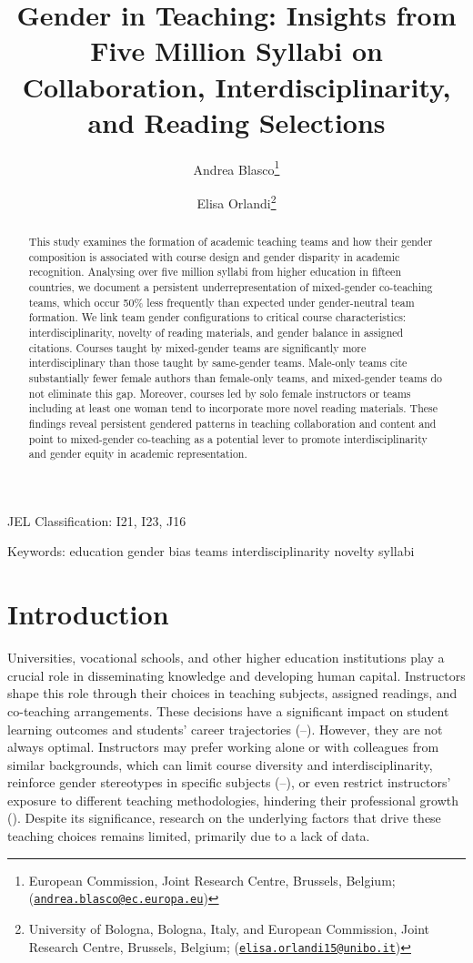 \documentclass[
  12pt,
]{article}
\title{Gender in Teaching:
Insights from Five Million Syllabi on Collaboration, Interdisciplinarity, and Reading Selections}
\author{Andrea Blasco\footnote{European Commission, Joint Research Centre, Brussels, Belgium; (\href{mailto:andrea.blasco@ec.europa.eu}{\nolinkurl{andrea.blasco@ec.europa.eu}})} \and Elisa Orlandi\footnote{University of Bologna, Bologna, Italy, and European Commission, Joint Research Centre, Brussels, Belgium; (\href{mailto:elisa.orlandi15@unibo.it}{\nolinkurl{elisa.orlandi15@unibo.it}})}}
\date{}
\let\oldsection\section
\renewcommand{\section}{\clearpage\oldsection}
\begin{document}
\maketitle
\begin{abstract}
This study examines the formation of academic teaching teams and how their gender composition is associated with course design and gender disparity in academic recognition. Analysing over five million syllabi from higher education in fifteen countries, we document a persistent underrepresentation of mixed-gender co-teaching teams, which occur 50\% less frequently than expected under gender-neutral team formation. We link team gender configurations to critical course characteristics: interdisciplinarity, novelty of reading materials, and gender balance in assigned citations. Courses taught by mixed-gender teams are significantly more interdisciplinary than those taught by same-gender teams. Male-only teams cite substantially fewer female authors than female-only teams, and mixed-gender teams do not eliminate this gap. Moreover, courses led by solo female instructors or teams including at least one woman tend to incorporate more novel reading materials. These findings reveal persistent gendered patterns in teaching collaboration and content and point to mixed-gender co-teaching as a potential lever to promote interdisciplinarity and gender equity in academic representation.
\end{abstract}

JEL Classification: I21, I23, J16

Keywords: education \textbar{} gender bias \textbar{} teams \textbar{} interdisciplinarity \textbar{} novelty \textbar{} syllabi

\newpage
\doublespace

\section{Introduction}\label{introduction}

Universities, vocational schools, and other higher education institutions play a crucial role in disseminating knowledge and developing human capital. Instructors shape this role through their choices in teaching subjects, assigned readings, and co-teaching arrangements. These decisions have a significant impact on student learning outcomes and students' career trajectories (--). However, they are not always optimal. Instructors may prefer working alone or with colleagues from similar backgrounds, which can limit course diversity and interdisciplinarity, reinforce gender stereotypes in specific subjects (--), or even restrict instructors' exposure to different teaching methodologies, hindering their professional growth (). Despite its significance, research on the underlying factors that drive these teaching choices remains limited, primarily due to a lack of data.
\end{document}
